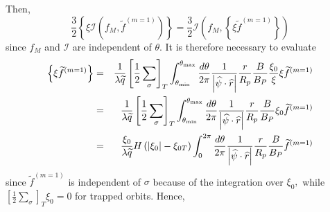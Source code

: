 Then,
\begin{equation}
\frac{3}{2}\left\{ \xi \mathcal{I}\left( f_{M},\widetilde{f}^{\left(
m=1\right) }\right) \right\} =\frac{3}{2}\mathcal{I}\left( f_{M},\left\{ \xi
\widetilde{f}^{\left( m=1\right) }\right\} \right)
\end{equation}
since $f_{M}$ and $\mathcal{I}$ are independent of $\theta .$ It is
therefore necessary to evaluate
\begin{eqnarray}
\left\{ \xi \widetilde{f}^{\left( m=1\right) }\right\}  &=&\frac{1}{\lambda
\widetilde{q}}\left[ \frac{1}{2}\sum_{\sigma }\right] _{T}\int_{\theta
_{\min }}^{\theta _{\max }}\frac{d\theta }{2\pi }\frac{1}{\left| \widehat{%
\psi }\cdot \widehat{r}\right| }\frac{r}{R_{p}}\frac{B}{B_{P}}\frac{\xi _{0}%
}{\xi }\xi \widetilde{f}^{\left( m=1\right) }  \nonumber \\
&=&\frac{1}{\lambda \widetilde{q}}\left[ \frac{1}{2}\sum_{\sigma }\right]
_{T}\int_{\theta _{\min }}^{\theta _{\max }}\frac{d\theta }{2\pi }\frac{1}{%
\left| \widehat{\psi }\cdot \widehat{r}\right| }\frac{r}{R_{p}}\frac{B}{B_{P}%
}\xi _{0}\widetilde{f}^{\left( m=1\right) }  \nonumber \\
&=&\frac{\xi _{0}}{\lambda \widetilde{q}}H\left( \left| \xi _{0}\right| -\xi
_{0T}\right) \int_{0}^{2\pi }\frac{d\theta }{2\pi }\frac{1}{\left| \widehat{%
\psi }\cdot \widehat{r}\right| }\frac{r}{R_{p}}\frac{B}{B_{P}}\widetilde{f}%
^{\left( m=1\right) }
\end{eqnarray}
since $\widetilde{f}^{\left( m=1\right) }$ is independent of $\sigma $
because of the integration over $\xi _{0},$ while $\left[ \frac{1}{2}%
\sum_{\sigma }\right] _{T}\xi _{0}=0$ for trapped orbits. Hence,
